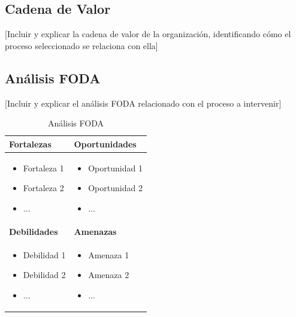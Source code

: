 \documentclass[12pt,letterpaper]{report}
\begin{document}
\subsection{Cadena de Valor}
[Incluir y explicar la cadena de valor de la organización, identificando cómo el proceso seleccionado se relaciona con ella]

\subsection{Análisis FODA}
[Incluir y explicar el análisis FODA relacionado con el proceso a intervenir]

\begin{table}[H]
    \centering
    \begin{tabular}{|p{}|p{}|}
        \hline
        \textbf{Fortalezas} & \textbf{Oportunidades} \\
        \hline
        \begin{itemize}
            \item Fortaleza 1
            \item Fortaleza 2
            \item ...
        \end{itemize} & 
        \begin{itemize}
            \item Oportunidad 1
            \item Oportunidad 2
            \item ...
        \end{itemize} \\
        \hline
        \textbf{Debilidades} & \textbf{Amenazas} \\
        \hline
        \begin{itemize}
            \item Debilidad 1
            \item Debilidad 2
            \item ...
        \end{itemize} & 
        \begin{itemize}
            \item Amenaza 1
            \item Amenaza 2
            \item ...
        \end{itemize} \\
        \hline
    \end{tabular}
    \caption{Análisis FODA}
\end{table}
\end{document}
